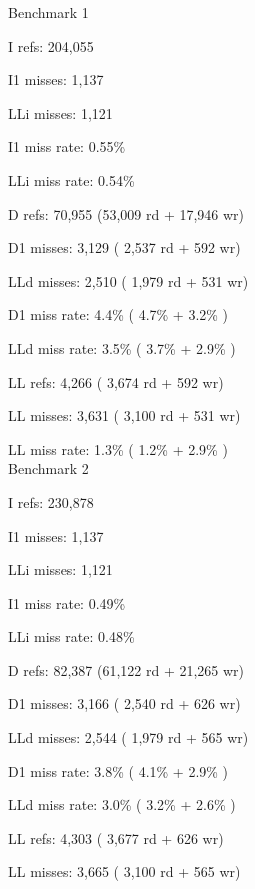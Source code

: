 \documentclass{article}
\begin{document}
    \begin{multicols}{2}
        Benchmark 1
 
        I   refs:      204,055
        
        I1  misses:      1,137
        
        LLi misses:      1,121
        
        I1  miss rate:    0.55\%
        
        LLi miss rate:    0.54\%
        
        D   refs:       70,955  (53,009 rd   + 17,946 wr)
        
        D1  misses:      3,129  ( 2,537 rd   +    592 wr)
        
        LLd misses:      2,510  ( 1,979 rd   +    531 wr)
        
        D1  miss rate:     4.4\% (   4.7\%     +    3.2\%  )
        
        LLd miss rate:     3.5\% (   3.7\%     +    2.9\%  )
        
        LL refs:         4,266  ( 3,674 rd   +    592 wr)
        
        LL misses:       3,631  ( 3,100 rd   +    531 wr)
        
        LL miss rate:      1.3\% (   1.2\%     +    2.9\%  )\\
        
        
        Benchmark 2 

        I   refs:      230,878
        
        I1  misses:      1,137
        
        LLi misses:      1,121
        
        I1  miss rate:    0.49\%
        
        LLi miss rate:    0.48\%
        
        D refs: 82,387  (61,122 rd   + 21,265 wr)
        
        D1 misses: 3,166  ( 2,540 rd   +    626 wr)
        
        LLd misses:      2,544  ( 1,979 rd   +    565 wr)
        
        D1  miss rate:     3.8\% (   4.1\%     +    2.9\%  )
        
        LLd miss rate:     3.0\% (   3.2\%     +    2.6\%  )
        
        LL refs:         4,303  ( 3,677 rd   +    626 wr)
        
        LL misses:       3,665  ( 3,100 rd   +    565 wr)
        

\end{multicols}
\end{document}
